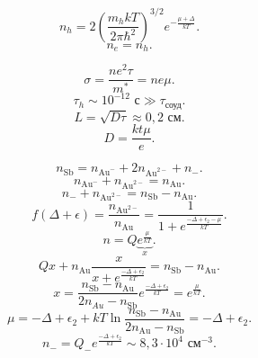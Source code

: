 \documentclass[a4paper]{article}
\begin{document}
\begin{hiProb}[4.40]
\end{hiProb}
\begin{sol}
	\[
		n_h= 2 \left( \frac{m_h k T}{2\pi \hbar^2} \right) ^{3 /2} e^{- \frac{\mu+\Delta}{kT}}
	.\] 
	\[
	n_e=n_h
	.\] 
\end{sol}
\begin{hiProb}[4.2]
\end{hiProb}
\begin{sol}
	\[
	\sigma= \frac{ne^2 \tau}{m^*}=ne\mu
	.\]
	\[
	\tau_h \sim 10^{-12 }\text{ с}\gg \tau_\text{соуд}
	.\] 
	\[
	L= \sqrt{D \tau} \approx 0,2 \text{ см}
	.\] 
	\[
	D= \frac{kt\mu}{e}
	.\] 
	 
\end{sol}
\begin{hiProb}[4.25]
\end{hiProb}
\begin{sol}
\[
n_{\text{Sb}}= n_{\operatorname{Au}^-}+2 n_{\operatorname{Au}^{2-}}
+n_-
.\] 
\[
n_{\operatorname{Au}^-}+n_{\operatorname{Au}^{2-}}=n_{\operatorname{Au}}
.\] 
\[
n_-+n_{\operatorname{Au}^{2-}}=n_{\operatorname{Sb}}-n_{\operatorname{Au}}
.\] 
\[
	f(\Delta+\epsilon)= \frac{n_{\operatorname{Au}^{2-}}}{n_{\operatorname{Au}}}=\frac{1}{1+ e^{\frac{-\Delta+\epsilon_2 -\mu}{kT}}}
.\] 
\[
n=Q \underbrace{e^{\frac{\mu}{kT}}
}_{x}.\] 
\[
Qx+n_{\operatorname{Au}} \frac{x}{x+e^{\frac{-\Delta+\epsilon_2}{kT}}}
=n_{\operatorname{Sb}}-n_{\operatorname{Au}}
.\] 
\[
x= \frac{n_{\operatorname{Sb}}-n_{\operatorname{Au}}}{2n_{Au}-n_{\operatorname{Sb}}}e^{\frac{-\Delta +\epsilon_2}{kT}}=e^{\frac{\mu}{kT}}
.\] 
\[
\mu= -\Delta+\epsilon_2+kT \ln \frac{n_{\operatorname{Sb}}-n_{\operatorname{Au}}}{2n_{\operatorname{Au}}-n_{\operatorname{Sb}}}=-\Delta+\epsilon_2
.\] 
\[
n_{-}=Q_- e^{\frac{-\Delta +\epsilon_2}{kT}}\sim 8,3 \cdot 10^{4}
\text{ см}^{-3}
.\] 
\end{sol}
\end{document}
